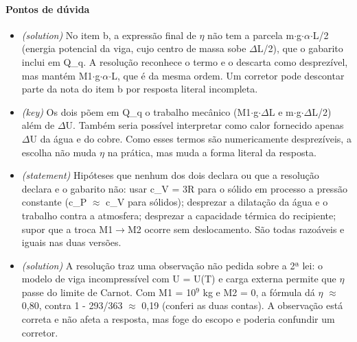 \documentclass{article}%
\begin{document}
\paragraph{Pontos de dúvida}%
\begin{itemize}%
\item%
\textit{(solution)} No item b, a expressão final de $\eta$ não tem a parcela m$\cdot$g$\cdot$$\alpha$$\cdot$L/2 (energia potencial da viga, cujo centro de massa sobe $\Delta$L/2), que o gabarito inclui em Q\_q. A resolução reconhece o termo e o descarta como desprezível, mas mantém M1$\cdot$g$\cdot$$\alpha$$\cdot$L, que é da mesma ordem. Um corretor pode descontar parte da nota do item b por resposta literal incompleta.%
\item%
\textit{(key)} Os dois põem em Q\_q o trabalho mecânico (M1$\cdot$g$\cdot$$\Delta$L e m$\cdot$g$\cdot$$\Delta$L/2) além de $\Delta$U. Também seria possível interpretar como calor fornecido apenas $\Delta$U da água e do cobre. Como esses termos são numericamente desprezíveis, a escolha não muda $\eta$ na prática, mas muda a forma literal da resposta.%
\item%
\textit{(statement)} Hipóteses que nenhum dos dois declara ou que a resolução declara e o gabarito não: usar c\_V = 3R para o sólido em processo a pressão constante (c\_P $\approx$ c\_V para sólidos); desprezar a dilatação da água e o trabalho contra a atmosfera; desprezar a capacidade térmica do recipiente; supor que a troca M1$\to$M2 ocorre sem deslocamento. São todas razoáveis e iguais nas duas versões.%
\item%
\textit{(solution)} A resolução traz uma observação não pedida sobre a 2ª lei: o modelo de viga incompressível com U = U(T) e carga externa permite que $\eta$ passe do limite de Carnot. Com M1 = 10$^{9}$ kg e M2 = 0, a fórmula dá $\eta$ $\approx$ 0,80, contra 1 - 293/363 $\approx$ 0,19 (conferi as duas contas). A observação está correta e não afeta a resposta, mas foge do escopo e poderia confundir um corretor.%
\end{itemize}%
\end{document}
